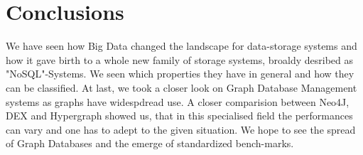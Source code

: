 \documentclass{acm_proc_article-sp}
\begin{document}
\section{Conclusions}

We have seen how Big Data changed the landscape for data-storage systems and how it gave birth to a whole new family of storage systems, broaldy desribed as "NoSQL"-Systems. We seen which properties they have in general and how they can be classified. At last, we took a closer look on Graph Database Management systems as graphs have widespdread use. A closer comparision between Neo4J, DEX and Hypergraph showed us, that in this specialised field the performances can vary and one has to adept to the given situation. We hope to see the spread of Graph Databases and the emerge of standardized bench-marks.


%

%
%
\end{document}
